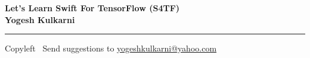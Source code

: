 
\graphicspath{{images/}}

\footnotesize


\begin{center}
\Large{\textbf{Let's Learn Swift For TensorFlow (S4TF)\\ Yogesh Kulkarni}}  
\end{center}

\begin{multicols}{2}

\end{multicols}

\rule{\linewidth}{0.25pt}
\scriptsize
Copyleft \textcopyleft\  Send suggestions to 
\href{http://www.yogeshkulkarni.com}{yogeshkulkarni@yahoo.com}


